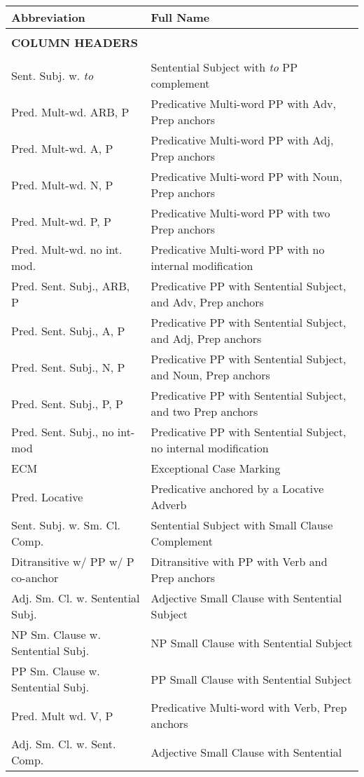 \small
\begin{tabular}{ll}
Abbreviation&Full Name\\
\hline
& \\
{\bf COLUMN HEADERS} &\\
& \\
Sent. Subj. w. {\it to} & Sentential Subject with {\it to} PP complement \\
Pred. Mult-wd. ARB, P & Predicative Multi-word PP with Adv, Prep anchors\\
Pred. Mult-wd. A, P & Predicative Multi-word PP with Adj, Prep anchors\\
Pred. Mult-wd. N, P & Predicative Multi-word PP with Noun, Prep
anchors\\
Pred. Mult-wd. P, P & Predicative Multi-word PP with two Prep
anchors\\
Pred. Mult-wd. no int. mod. & Predicative Multi-word PP with no internal
modification\\
Pred. Sent. Subj., ARB, P & Predicative PP with Sentential Subject, and
Adv, Prep anchors\\
Pred. Sent. Subj., A, P & Predicative PP with Sentential Subject, and
Adj, Prep anchors\\
Pred. Sent. Subj., N, P & Predicative PP with Sentential Subject, and
Noun, Prep anchors\\
Pred. Sent. Subj., P, P & Predicative PP with Sentential Subject, and two
Prep anchors\\
Pred. Sent. Subj., no int-mod & Predicative PP with Sentential Subject,
no internal modification\\
ECM & Exceptional Case Marking\\
Pred. Locative & Predicative anchored by a Locative Adverb\\
Sent. Subj. w. Sm. Cl. Comp. & Sentential Subject with Small Clause
Complement\\
Ditransitive w/ PP w/ P co-anchor & Ditransitive with PP with Verb and Prep
anchors\\
Adj. Sm. Cl. w. Sentential Subj. & Adjective Small Clause with Sentential Subject\\
NP Sm. Clause w. Sentential Subj. & NP Small Clause with Sentential Subject\\
PP Sm. Clause w. Sentential Subj. & PP Small Clause with Sentential Subject\\
Pred. Mult wd. V, P & Predicative Multi-word with Verb, Prep anchors \\
Adj. Sm. Cl. w. Sent. Comp.&Adjective Small Clause with Sentential

\end{tabular}

